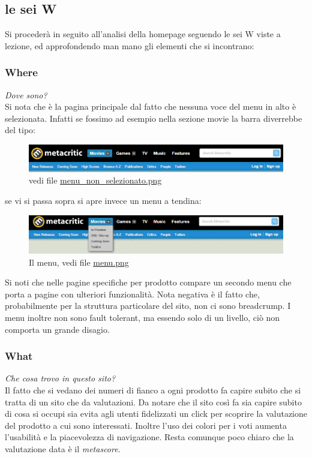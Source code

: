 \documentclass[12pt]{article}
\begin{document}
\subsection{le sei W}
Si procederà in seguito all'analisi della homepage seguendo le sei W viste a lezione, ed approfondendo man mano gli elementi che si incontrano:

\subsubsection{Where}
\textit{Dove sono?}\\
Si nota che è la pagina principale dal fatto che nessuna voce del menu in alto è selezionata.
Infatti se fossimo ad esempio nella sezione movie la barra diverrebbe del tipo:
\begin{figure}[H]
	\begin{center}
		\includegraphics[width=13.5cm]{menu_non_selezionato.png}
		\caption{vedi file \href{menu_non_selezionato.png}{menu\_non\_selezionato.png}}
	\end{center}
\end{figure}
se vi si passa sopra si apre invece un menu a tendina:
\begin{figure}[H]
	\begin{center}
		\includegraphics[width=13.5cm]{menu.png}
		\caption{Il menu, vedi file \href{menu.png}{menu.png}}
	\end{center}
\end{figure}
Si noti che nelle pagine specifiche per prodotto compare un secondo menu che porta a pagine con ulteriori funzionalità.
Nota negativa è il fatto che, probabilmente per la struttura particolare del sito, non ci sono breadcrump. I menu inoltre non sono fault tolerant, ma essendo solo di un livello, ciò non comporta un grande disagio.
\subsubsection{What}
\textit{Che cosa trovo in questo sito?}\\
Il fatto che si vedano dei numeri di fianco a ogni prodotto fa capire subito che si tratta di un sito che da valutazioni. Da notare che il sito così fa sia capire subito di cosa si occupi sia evita agli utenti fidelizzati un click per scoprire la valutazione del prodotto a cui sono interessati. Inoltre l'uso dei colori per i voti aumenta l'usabilità e la piacevolezza di navigazione. Resta comunque poco chiaro che la valutazione data è il \textit{metascore}.
\end{document}
